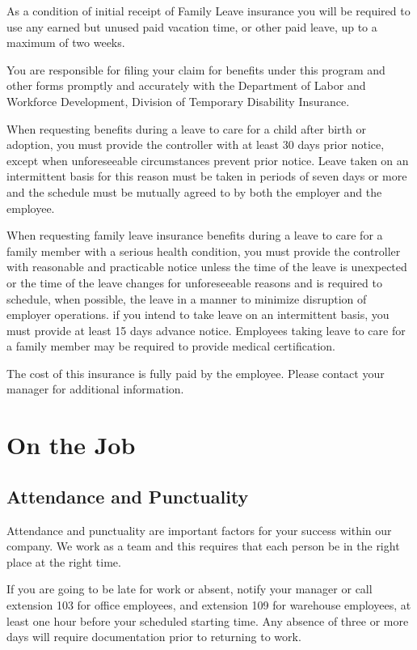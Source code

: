 As a condition of initial receipt of Family Leave insurance you will be required to use any earned but unused paid vacation time, or other paid leave, up to a maximum of two weeks.

You are responsible for filing your claim for benefits under this program and other forms promptly and accurately with the Department of Labor and Workforce Development, Division of Temporary Disability Insurance.

When requesting benefits during a leave to care for a child after birth or adoption, you must provide the controller with at least 30 days prior notice, except when unforeseeable circumstances prevent prior notice. Leave taken on an intermittent basis for this reason must be taken in periods of seven days or more and the schedule must be mutually agreed to by both the employer and the employee.

When requesting family leave insurance benefits during a leave to care for a family member with a serious health condition, you must provide the controller with reasonable and practicable notice unless the time of the leave is unexpected or the time of the leave changes for unforeseeable reasons and is required to schedule, when possible, the leave in a manner to minimize disruption of employer operations. if you intend to take leave on an intermittent basis, you must provide at least 15 days advance notice. Employees taking leave to care for a family member may be required to provide medical certification.

The cost of this insurance is fully paid by the employee. Please contact your manager for additional information.

\section{On the Job}

\subsection{Attendance and Punctuality}

Attendance and punctuality are important factors for your success within our company. We work as a team and this requires that each person be in the right place at the right time.

If you are going to be late for work or absent, notify your manager or call extension 103 for office employees, and extension 109 for warehouse employees, at least one hour before your scheduled starting time. Any absence of three or more days will require documentation prior to returning to work.

